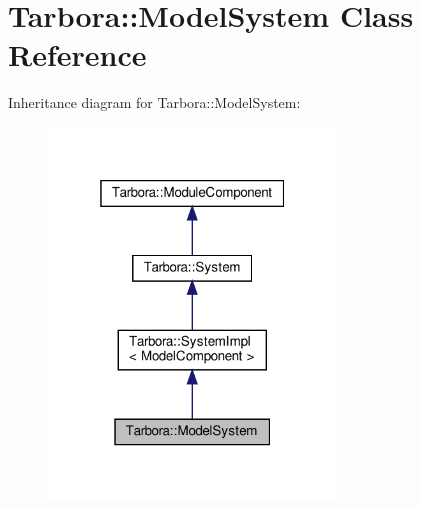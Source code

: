 \hypertarget{classTarbora_1_1ModelSystem}{}\section{Tarbora\+:\+:Model\+System Class Reference}
\label{classTarbora_1_1ModelSystem}


Inheritance diagram for Tarbora\+:\+:Model\+System\+:
\nopagebreak
\begin{figure}[H]
\begin{center}
\leavevmode
\includegraphics[width=217pt]{classTarbora_1_1ModelSystem__inherit__graph}
\end{center}
\end{figure}


